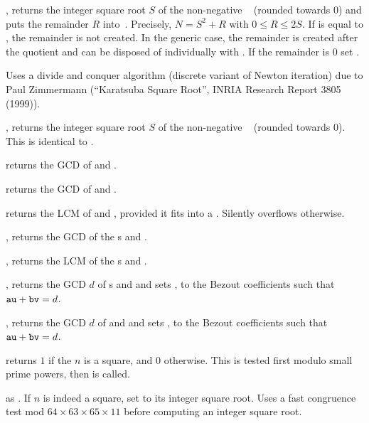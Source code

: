 , returns the integer square root $S$ of
the non-negative ~ (rounded towards 0) and puts the remainder
$R$ into~. Precisely, $N = S^2 + R$ with $0\leq R \leq 2S$. If
 is equal to , the remainder is not created. In the generic
case, the remainder is created after the quotient and can be disposed of
individually with . If the remainder is $0$ set .

Uses a divide and conquer algorithm (discrete variant of Newton iteration)
due to Paul Zimmermann (``Karatsuba Square Root'', INRIA Research Report 3805
(1999)).

, returns the integer square root $S$ of
the non-negative ~ (rounded towards 0). This is identical
to .


 returns the GCD of  and .

 returns the GCD of  and .

 returns the LCM of  and ,
provided it fits into a . Silently overflows otherwise.

, returns the GCD of the s  and
.

, returns the LCM of the s  and
.

, returns the GCD $d$ of
s  and  and sets ,  to the Bezout
coefficients such that ${\tt au} + {\tt bv} = d$.

, returns the GCD
$d$ of  and  and sets ,  to the Bezout coefficients
such that ${\tt au} + {\tt bv} = d$.


 returns $1$ if the  $n$ is
a square, and $0$ otherwise. This is tested first modulo small prime
powers, then  is called.

 as . If
$n$ is indeed a square, set  to its integer square root.
Uses a fast congruence test mod $64\times 63\times 65\times 11$ before
computing an integer square root.

